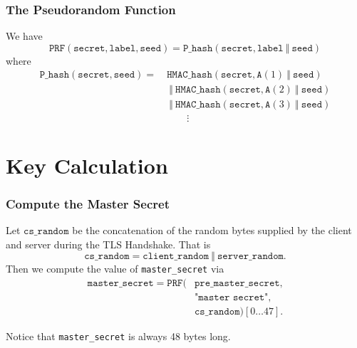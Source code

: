 \documentclass[aspectratio=169]{beamer}
\begin{document}
\begin{frame}
	\frametitle{The Pseudorandom Function}
	We have
	\begin{equation} \nonumber
		\texttt{PRF}(\texttt{secret}, \texttt{label}, \texttt{seed}) = \texttt{P\_hash}(\texttt{secret}, \texttt{label} \ \Vert \  \texttt{seed})
	\end{equation}
	where
	\begin{equation} \nonumber
	\begin{split}
		\texttt{P\_hash}(\texttt{secret}, \texttt{seed}) = \ &\texttt{HMAC\_hash}(\texttt{secret}, \texttt{A}(1) \ \Vert \  \texttt{seed})\\
		&\ \Vert \ \texttt{HMAC\_hash}(\texttt{secret}, \texttt{A}(2) \ \Vert \  \texttt{seed}) \\
		&\ \Vert \ \texttt{HMAC\_hash}(\texttt{secret}, \texttt{A}(3) \ \Vert \  \texttt{seed}) \\
		&\qquad \vdots
	\end{split}
	\end{equation}
\end{frame}

\section{Key Calculation}
\begin{frame}[Roundel=siiorange]
	\tocpage
\end{frame}

\begin{frame}
	\frametitle{Compute the Master Secret}
	Let $\texttt{cs\_random}$ be the concatenation of the random bytes supplied by the client and server during the TLS Handshake. That is
	\begin{equation} \nonumber
	\texttt{cs\_random} = \texttt{client\_random} \ \Vert \ \texttt{server\_random}.
	\end{equation}
	Then we compute the value of \texttt{master\_secret} via
	\begin{align*}
		\texttt{master\_secret} = \texttt{PRF}(&\texttt{pre\_master\_secret},\\
		&\texttt{"master secret"},\\
		&\texttt{cs\_random})[0\ldots 47].
	\end{align*}
	
	\vfill
	
	Notice that \texttt{master\_secret} is always 48 bytes long.
\end{frame}
\end{document}
